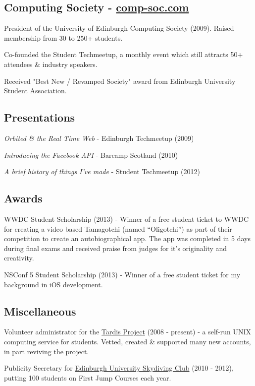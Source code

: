 \documentclass[a4paper]{article}
\renewenvironment{itemize}{
  \begin{list}{}{
    \setlength{\leftmargin}{1.5em}
  }
}{
  \end{list}
}
\begin{document}
\subsection*{Computing Society - \href{http://comp-soc.com}{comp-soc.com}}
\begin{itemize}
\item President of the University of Edinburgh Computing Society (2009). Raised membership from 30 to 250+ students.
\item Co-founded the Student Techmeetup, a monthly event which still attracts 50+ attendees \& industry speakers.
\item Received "Best New / Revamped Society" award from Edinburgh University Student Association.
\end{itemize}

\subsection*{Presentations}
\begin{itemize}
\item \emph{Orbited \& the Real Time Web} - Edinburgh Techmeetup (2009)
\item \emph{Introducing the Facebook API} - Barcamp Scotland (2010)
\item \emph{A brief history of things I've made} - Student Techmeetup (2012)
\end{itemize}

\subsection*{Awards}
\begin{itemize}
\item WWDC Student Scholarship (2013) - Winner of a free student ticket to WWDC for creating a video based Tamagotchi (named ``Oligotchi'') as part of their competition to create an autobiographical app. The app was completed in 5 days during final exams and received praise from judges for it's originality and creativity. 
\item NSConf 5 Student Scholarship (2013) - Winner of a free student ticket for my background in iOS development.
\end{itemize}

\subsection*{Miscellaneous}
\begin{itemize}
\item Volunteer administrator for the \href{http://www.tardis.ed.ac.uk/}{Tardis Project} (2008 - present) - a self-run UNIX computing service for students. Vetted, created \& supported many new accounts, in part reviving the project.
\item Publicity Secretary for \href{http://facebook.com/getjumped/}{Edinburgh University Skydiving Club} (2010 - 2012), putting 100 students on First Jump Courses each year.
\end{itemize}
\end{document}
